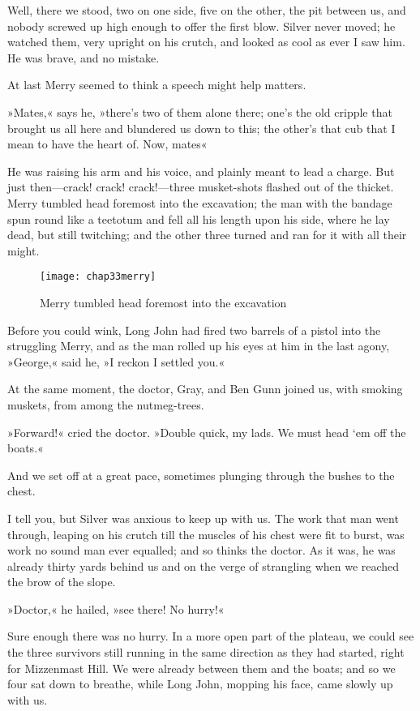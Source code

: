 Well, there we stood, two on one side, five on the other, the pit between us, and nobody screwed up high enough to offer the first blow. Silver never moved; he watched them, very upright on his crutch, and looked as cool as ever I saw him. He was brave, and no mistake.

At last Merry seemed to think a speech might help matters.

»Mates,« says he, »there's two of them alone there; one's the old cripple that brought us all here and blundered us down to this; the other's that cub that I mean to have the heart of. Now, mates\longdash«

He was raising his arm and his voice, and plainly meant to lead a charge. But just then—crack! crack! crack!—three musket-shots flashed out of the thicket. Merry tumbled head foremost into the excavation; the man with the bandage spun round like a teetotum and fell all his length upon his side, where he lay dead, but still twitching; and the other three turned and ran for it with all their might.

 \begin{figure}[p]
\centering
\texttt{[image: chap33merry]}
\caption{Merry tumbled head foremost into the excavation}
\end{figure}  

Before you could wink, Long John had fired two barrels of a pistol into the struggling Merry, and as the man rolled up his eyes at him in the last agony, »George,« said he, »I reckon I settled you.«

At the same moment, the doctor, Gray, and Ben Gunn joined us, with smoking muskets, from among the nutmeg-trees.

»Forward!« cried the doctor. »Double quick, my lads. We must head `em off the boats.«

And we set off at a great pace, sometimes plunging through the bushes to the chest.

I tell you, but Silver was anxious to keep up with us. The work that man went through, leaping on his crutch till the muscles of his chest were fit to burst, was work no sound man ever equalled; and so thinks the doctor. As it was, he was already thirty yards behind us and on the verge of strangling when we reached the brow of the slope.

»Doctor,« he hailed, »see there! No hurry!«

Sure enough there was no hurry. In a more open part of the plateau, we could see the three survivors still running in the same direction as they had started, right for Mizzenmast Hill. We were already between them and the boats; and so we four sat down to breathe, while Long John, mopping his face, came slowly up with us.

